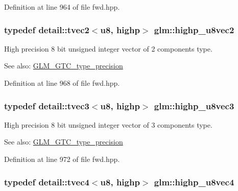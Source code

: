 Definition at line 964 of file fwd.hpp.\hypertarget{group__gtc__type__precision_g9aed4b3bacd37a43ec369bcf76be144a}{
\subsubsection[highp\_\-u8vec2]{\setlength{\rightskip}{0pt plus 5cm}typedef detail::tvec2$<$u8, highp$>$ {\bf glm::highp\_\-u8vec2}}}
\label{group__gtc__type__precision_g9aed4b3bacd37a43ec369bcf76be144a}


High precision 8 bit unsigned integer vector of 2 components type. \begin{Desc}
\item[See also:]\hyperlink{group__gtc__type__precision}{GLM\_\-GTC\_\-type\_\-precision} \end{Desc}


Definition at line 968 of file fwd.hpp.\hypertarget{group__gtc__type__precision_g52bdf53a4f05023c13a9b817526d249f}{
\subsubsection[highp\_\-u8vec3]{\setlength{\rightskip}{0pt plus 5cm}typedef detail::tvec3$<$u8, highp$>$ {\bf glm::highp\_\-u8vec3}}}
\label{group__gtc__type__precision_g52bdf53a4f05023c13a9b817526d249f}


High precision 8 bit unsigned integer vector of 3 components type. \begin{Desc}
\item[See also:]\hyperlink{group__gtc__type__precision}{GLM\_\-GTC\_\-type\_\-precision} \end{Desc}


Definition at line 972 of file fwd.hpp.\hypertarget{group__gtc__type__precision_g3a46f19674a65471988b41ffdaa834c5}{
\subsubsection[highp\_\-u8vec4]{\setlength{\rightskip}{0pt plus 5cm}typedef detail::tvec4$<$u8, highp$>$ {\bf glm::highp\_\-u8vec4}}}
\label{group__gtc__type__precision_g3a46f19674a65471988b41ffdaa834c5}


